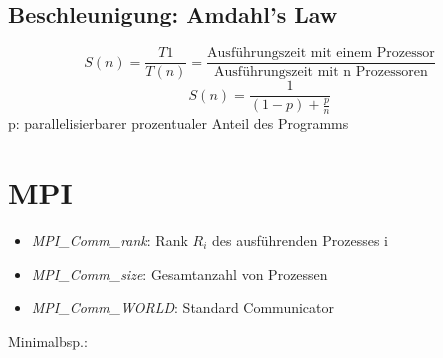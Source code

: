 \subsection{Beschleunigung: Amdahl's Law }
$$S(n) = \frac{T1}{T(n)}=\frac{\text{Ausführungszeit mit einem Prozessor}}{\text{Ausführungszeit mit n Prozessoren}}$$
$$S(n)= \frac{1}{(1-p)+ \frac{p}{n}}$$
p: parallelisierbarer prozentualer Anteil des Programms

\section{MPI}
\begin{itemize}
	\item \textit{MPI\_Comm\_rank}: Rank $R_i$ des ausführenden Prozesses i
	\item \textit{MPI\_Comm\_size}: Gesamtanzahl von Prozessen
	\item \textit{MPI\_Comm\_WORLD}: Standard Communicator	
\end{itemize}
Minimalbsp.: 